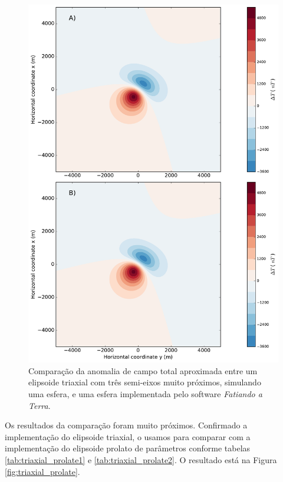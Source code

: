 \begin{figure}[hbt!]
	\centering \includegraphics[width=14.5 cm,height=22 cm]{figures/ellipsoid_triaxial_sphere}
	\caption[Comparação da anomalia de campo total aproximada entre um elipsoide triaxial com três semi-eixos muito próximos, simulando uma esfera, 
	e uma esfera.]{Comparação da anomalia de campo total aproximada entre um elipsoide triaxial com três semi-eixos muito próximos, simulando uma esfera, e uma esfera implementada pelo software \textit{Fatiando a Terra}.}
	\label{fig:triaxial_sphere}
\end{figure}

Os resultados da comparação foram muito próximos. Confirmado a implementação do elipsoide triaxial, o usamos para comparar com a implementação do elipsoide prolato de parâmetros conforme tabelas \ref{tab:triaxial_prolate1} e \ref{tab:triaxial_prolate2}. O resultado está na Figura \ref{fig:triaxial_prolate}.

